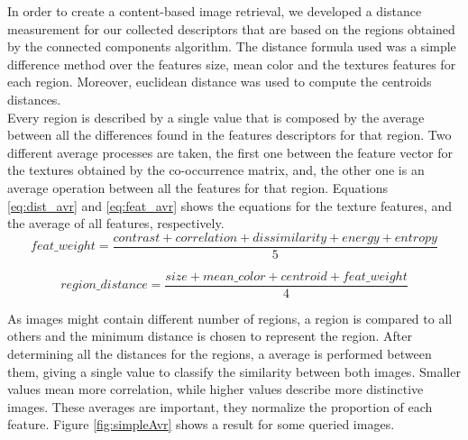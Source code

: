 \documentclass[12pt,a4paper]{article}
\begin{document}
In order to create a content-based image retrieval, we developed a distance measurement for our collected descriptors that are based on the regions obtained by the connected components algorithm. The distance formula used was a simple difference method over the features size, mean color and the textures features for each region. Moreover, euclidean distance was used to compute the centroids distances. \\

Every region is described by a single value that is composed by the average between all the differences found in the features descriptors for that region. Two different average processes are taken, the first one between the feature vector for the textures obtained by the co-occurrence matrix, and, the other one is an average operation between all the features for that region. Equations \ref{eq:dist_avr} and \ref{eq:feat_avr} shows the equations for the texture features, and the average of all features, respectively. \\

\begin{equation}
	feat\_weight =  \frac{contrast + correlation + dissimilarity +  energy + entropy}{5}
	\label{eq:dist_avr}
\end{equation}

\begin{equation}
region\_distance =  \frac{size + mean\_color + centroid +  feat\_weight}{4}
\label{eq:feat_avr}
\end{equation}

As images might contain different number of regions, a region is compared to all others and the minimum distance is chosen to represent the region. After determining all the distances for the regions, a average is performed between them, giving a single value to classify the similarity between both images. Smaller values mean more correlation, while higher values describe more distinctive images. These averages are important, they normalize the proportion of each feature. Figure \ref{fig:simpleAvr} shows a result for some queried images. \\
\end{document}
